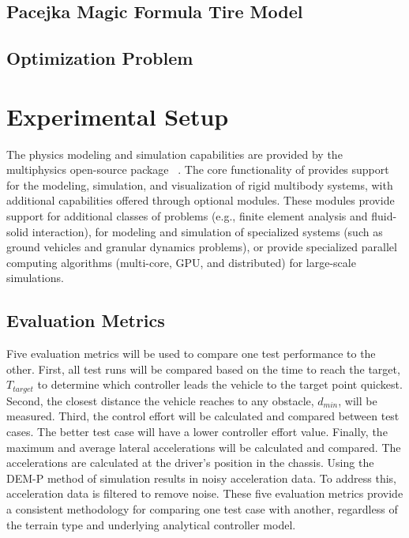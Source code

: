 \documentclass[12pt,onecolumn]{article}
\newcommand{\CHRONO}{{\sffamily{{Chrono}}}}
\begin{document}

\subsection{Pacejka Magic Formula Tire Model}\label{Pacejka}


\subsection{Optimization Problem}\label{Optimization}


\section{Experimental Setup}\label{ExpSetup}

The physics modeling and simulation capabilities are provided by the multiphysics open-source package {\CHRONO}~\cite{Chrono2016}. The core functionality of {\CHRONO} provides support for the modeling, simulation, and visualization of rigid multibody systems, with additional capabilities offered through optional modules. These modules provide support for additional classes of problems (e.g., finite element analysis and fluid-solid interaction), for modeling and simulation of specialized systems (such as ground vehicles and granular dynamics problems), or provide specialized parallel computing algorithms (multi-core, GPU, and distributed) for large-scale simulations.

\subsection{Evaluation Metrics}\label{ss:Metrics}
Five evaluation metrics will be used to compare one test performance to the other. First, all test runs will be compared based on the time to reach the target, $T_{target}$ to determine which controller leads the vehicle to the target point quickest. Second, the closest distance the vehicle reaches to any obstacle, $d_{min}$, will be measured. Third, the control effort will be calculated and compared between test cases. The better test case will have a lower controller effort value. Finally, the maximum and average lateral accelerations will be calculated and compared. The accelerations are calculated at the driver's position in the chassis. Using the DEM-P method of simulation results in noisy acceleration data. To address this, acceleration data is filtered to remove noise. These five evaluation metrics provide a consistent methodology for comparing one test case with another, regardless of the terrain type and underlying analytical controller model.
\end{document}
